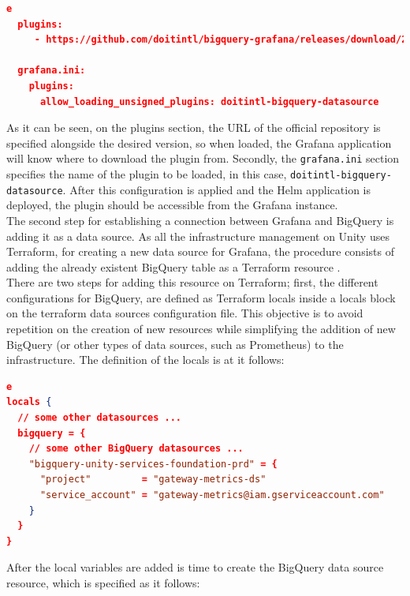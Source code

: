 \documentclass[english, 12pt, a4paper, sci, utf8, a-1b, online]{aaltothesis}
\begin{document}
\begin{lstlisting}[language=json,firstnumber=1]e
  plugins:
     - https://github.com/doitintl/bigquery-grafana/releases/download/2.0.3/doitintl-bigquery-datasource-2.0.3.zip;doit-bigquery-datasource

  grafana.ini:
    plugins:
      allow_loading_unsigned_plugins: doitintl-bigquery-datasource
\end{lstlisting}

As it can be seen, on the plugins section, the URL of the official repository is specified alongside the desired version, so when loaded, the Grafana application will know where to download the plugin from. Secondly, the \texttt{grafana.ini} section specifies the name of the plugin to be loaded, in this case, \texttt{doitintl-bigquery-datasource}. After this configuration is applied and the Helm application is deployed, the plugin should be accessible from the Grafana instance.\\

The second step for establishing a connection between Grafana and BigQuery is adding it as a data source. As all the infrastructure management on Unity uses Terraform, for creating a new data source for Grafana, the procedure consists of adding the already existent BigQuery table as a Terraform resource \cite{TerraformResource}.\\

There are two steps for adding this resource on Terraform; first, the different configurations for BigQuery, are defined as Terraform locals \cite{TerraformLocals} inside a locals block on the terraform data sources configuration file. This objective is to avoid repetition on the creation of new resources while simplifying the addition of new BigQuery (or other types of data sources, such as Prometheus) to the infrastructure. The definition of the locals is at it follows:\\

\begin{lstlisting}[language=json,firstnumber=1]e
locals {
  // some other datasources ...
  bigquery = {
    // some other BigQuery datasources ...
    "bigquery-unity-services-foundation-prd" = {
      "project"         = "gateway-metrics-ds"
      "service_account" = "gateway-metrics@iam.gserviceaccount.com"
    }
  }
}
\end{lstlisting}

After the local variables are added is time to create the BigQuery data source resource, which is specified as it follows:\\
\end{document}
